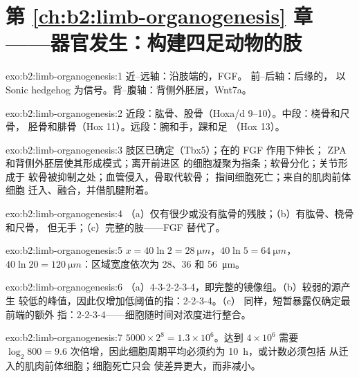 \section*{第 \ref{ch:b2:limb-organogenesis} 章——器官发生：构建四足动物的肢}

\begin{solution}{exo:b2:limb-organogenesis:1}
近–远轴：沿肢端的，FGF。
前–后轴：后缘的，
以 Sonic hedgehog 为信号。背–腹轴：背侧外胚层，Wnt7a。
\end{solution}

\begin{solution}{exo:b2:limb-organogenesis:2}
近段：肱骨、股骨（Hoxa/d 9--10）。中段：桡骨和尺骨，
胫骨和腓骨（Hox 11）。远段：腕和手，踝和足
（Hox 13）。
\end{solution}

\begin{solution}{exo:b2:limb-organogenesis:3}
肢区已确定（Tbx5）；在的 FGF 作用下伸长；
ZPA 和背侧外胚层使其形成模式；离开前进区
的细胞凝聚为指条；软骨分化；关节形成于
软骨被抑制之处；血管侵入，骨取代软骨；
指间细胞死亡；来自的肌肉前体细胞
迁入、融合，并借肌腱附着。
\end{solution}

\begin{solution}{exo:b2:limb-organogenesis:4}
（a）仅有很少或没有肱骨的残肢；（b）有肱骨、桡骨和尺骨，
但无手；（c）完整的肢——FGF 替代了。
\end{solution}

\begin{solution}{exo:b2:limb-organogenesis:5}
$x = 40\ln 2 = \qty{28}{\micro m}$，$40\ln 5 = \qty{64}{\micro m}$，
$40\ln 20 = \qty{120}{\micro m}$：区域宽度依次为 28、36 和
\qty{56}{\micro m}。
\end{solution}

\begin{solution}{exo:b2:limb-organogenesis:6}
（a）4-3-2-2-3-4，即完整的镜像组。（b）较弱的源产生
较低的峰值，因此仅增加低阈值的指：2-2-3-4。（c）
同样，短暂暴露仅确定最前端的额外
指：2-2-3-4——细胞随时间对浓度进行整合。
\end{solution}

\begin{solution}{exo:b2:limb-organogenesis:7}
$5000\times 2^{8} = 1.3\times 10^{6}$。达到 $4\times 10^{6}$ 需要
$\log_2 800 = 9.6$ 次倍增，因此细胞周期平均必须约为
\qty{10}{h}，或计数必须包括
从迁入的肌肉前体细胞；细胞死亡只会
使差异更大，而非减小。
\end{solution}

